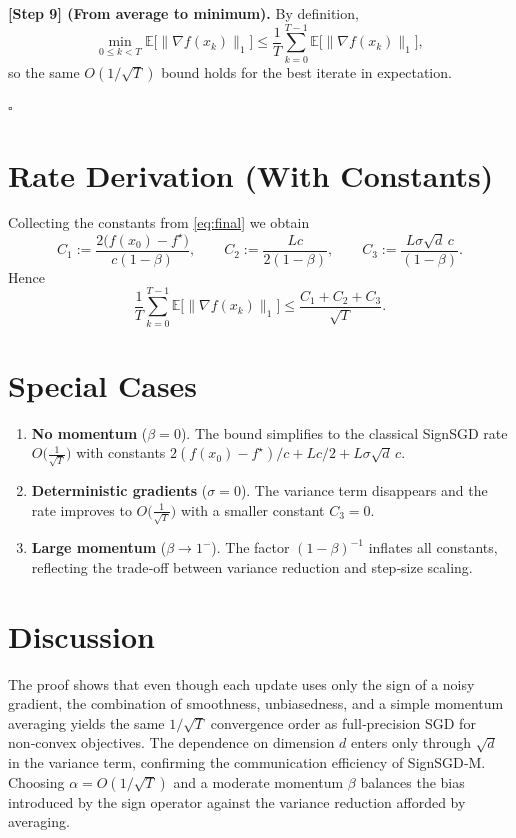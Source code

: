 \documentclass[11pt]{article}
\begin{document}
\bigskip
\noindent\textbf{[Step 9] (From average to minimum).}  
By definition,
\[
\min_{0\le k<T}\mathbb{E}\!\big[\|\nabla f(x_k)\|_1\big]
\le \frac{1}{T}\sum_{k=0}^{T-1}\mathbb{E}\!\big[\|\nabla f(x_k)\|_1\big],
\]
so the same $O(1/\sqrt{T})$ bound holds for the best iterate in expectation.

\hfill $\square$

\section*{Rate Derivation (With Constants)}
Collecting the constants from \eqref{eq:final} we obtain
\[
C_1:=\frac{2\big(f(x_0)-f^\star\big)}{c(1-\beta)},\qquad
C_2:=\frac{L c}{2(1-\beta)},\qquad
C_3:=\frac{L\sigma\sqrt{d}\,c}{(1-\beta)} .
\]
Hence
\[
\frac{1}{T}\sum_{k=0}^{T-1}\mathbb{E}\!\big[\|\nabla f(x_k)\|_1\big]
\le \frac{C_1+C_2+C_3}{\sqrt{T}} .
\]

\section*{Special Cases}
\begin{enumerate}[label=(\alph*)]
    \item \textbf{No momentum} ($\beta=0$). The bound simplifies to the classical SignSGD rate
    $\displaystyle O\!\big(\frac{1}{\sqrt{T}}\big)$ with constants $2(f(x_0)-f^\star)/c + Lc/2 + L\sigma\sqrt{d}\,c$.
    \item \textbf{Deterministic gradients} ($\sigma=0$). The variance term disappears and the rate improves to
    $\displaystyle O\!\big(\frac{1}{\sqrt{T}}\big)$ with a smaller constant $C_3=0$.
    \item \textbf{Large momentum} ($\beta\to1^{-}$). The factor $(1-\beta)^{-1}$ inflates all constants, reflecting the trade‑off between variance reduction and step‑size scaling.
\end{enumerate}

\section*{Discussion}
The proof shows that even though each update uses only the sign of a noisy gradient, the combination of smoothness, unbiasedness, and a simple momentum averaging yields the same $1/\sqrt{T}$ convergence order as full‑precision SGD for non‑convex objectives. The dependence on dimension $d$ enters only through $\sqrt{d}$ in the variance term, confirming the communication efficiency of SignSGD‑M. Choosing $\alpha=O(1/\sqrt{T})$ and a moderate momentum $\beta$ balances the bias introduced by the sign operator against the variance reduction afforded by averaging.
\end{document}

